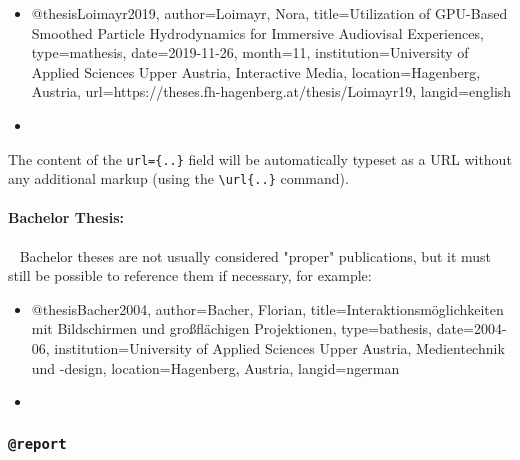 %
\begin{itemize}
\item[]
\begin{GenericCode}[numbers=none]
@thesis{Loimayr2019,
  author={Loimayr, Nora},
  title={Utilization of GPU-Based Smoothed Particle Hydrodynamics for Immersive Audiovisal Experiences},
  type={mathesis},
  date={2019-11-26},
  month={11},
  institution={University of Applied Sciences Upper Austria, Interactive Media},
  location={Hagenberg, Austria},
  url={https://theses.fh-hagenberg.at/thesis/Loimayr19},
  langid={english}
}
\end{GenericCode}
\item[\cite{Loimayr2019}] 
\end{itemize}
%
The content of the \verb!url={..}! field will be automatically typeset as a URL
without any additional markup (using the \verb!\url{..}! command).


\paragraph{Bachelor Thesis:} ~ \newline
Bachelor theses are not usually considered "proper" publications, but it must
still be possible to reference them if necessary, for example:
%
\begin{itemize}
\item[]
\begin{GenericCode}[numbers=none]
@thesis{Bacher2004,
  author={Bacher, Florian},
  title={Interaktionsmöglichkeiten mit Bildschirmen und großflächigen Projektionen},
  type={bathesis},
  date={2004-06},
  institution={University of Applied Sciences Upper Austria, Medientechnik und {-design}},
  location={Hagenberg, Austria},
  langid={ngerman}
}
\end{GenericCode}
\item[\cite{Bacher2004}] 
\end{itemize}


\subsubsection{\texttt{\bfseries @report}}
\label{sec:@report}


